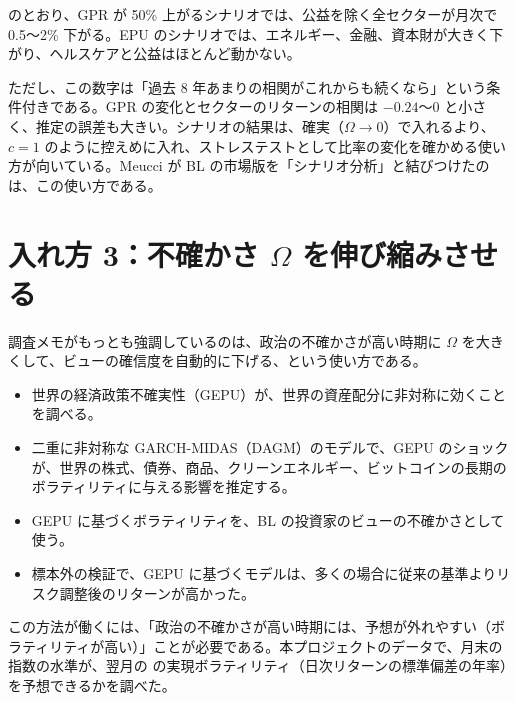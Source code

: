  のとおり、GPR が 50\% 上がるシナリオでは、公益を除く全セクターが月次で 0.5〜2\% 下がる。EPU のシナリオでは、エネルギー、金融、資本財が大きく下がり、ヘルスケアと公益はほとんど動かない。

ただし、この数字は「過去 8 年あまりの相関がこれからも続くなら」という条件付きである。GPR の変化とセクターのリターンの相関は $-0.24$〜0 と小さく、推定の誤差も大きい。シナリオの結果は、確実（$\Omega\to0$）で入れるより、$c=1$ のように控えめに入れ、ストレステストとして比率の変化を確かめる使い方が向いている。Meucci が BL の市場版を「シナリオ分析」と結びつけたのは、この使い方である。

\section{入れ方 3：不確かさ $\Omega$ を伸び縮みさせる}

調査メモがもっとも強調しているのは、政治の不確かさが高い時期に $\Omega$ を大きくして、ビューの確信度を自動的に下げる、という使い方である。

\begin{paperbox}
\begin{itemize}
\item 世界の経済政策不確実性（GEPU）が、世界の資産配分に非対称に効くことを調べる。
\item 二重に非対称な GARCH-MIDAS（DAGM）のモデルで、GEPU のショックが、世界の株式、債券、商品、クリーンエネルギー、ビットコインの長期のボラティリティに与える影響を推定する。
\item GEPU に基づくボラティリティを、BL の投資家のビューの不確かさとして使う。
\item 標本外の検証で、GEPU に基づくモデルは、多くの場合に従来の基準よりリスク調整後のリターンが高かった。
\end{itemize}
\end{paperbox}

この方法が働くには、「政治の不確かさが高い時期には、予想が外れやすい（ボラティリティが高い）」ことが必要である。本プロジェクトのデータで、月末の指数の水準が、翌月の \SP{} の実現ボラティリティ（日次リターンの標準偏差の年率）を予想できるかを調べた。

\begin{table}[htbp]
\centering
\caption{翌月の \SP{} の実現ボラティリティ（対数）の回帰（ か月）。説明変数は、当月の実現ボラティリティ、EPU、GPR の対数。}
\label{tab:unc-reg}
\end{table}

